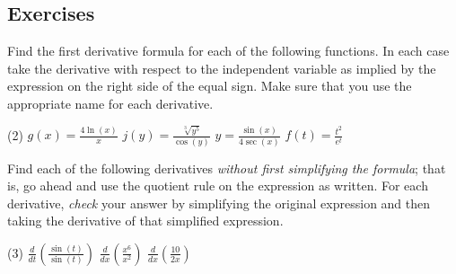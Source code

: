 \documentclass[12pt,]{book}
\theoremstyle{plain}
\theoremstyle{definition}
\numberwithin{equation}{section}
\newcommand{\fe}[2]{#1\mathopen{}\left(#2\right)\mathclose{}}
\newcommand{\lzoo}[2]{{\frac{d}{d#1}}{\left(#2\right)}}
\begin{document}
\subsection[Exercises]{Exercises}\label{exercises-38}
Find the first derivative formula for each of the following functions.  In each case take the derivative with respect to the independent variable as implied by the expression on the right side of the equal sign.  Make sure that you use the appropriate name for each derivative.%
\par
\begin{exercisegroup}(2)
\exercise[1.]\hypertarget{exercise-378}{\null}\(\fe{g}{x}=\frac{4\fe{\ln}{x}}{x}\)%
\exercise[2.]\hypertarget{exercise-379}{\null}\(\fe{j}{y}=\frac{\sqrt[3]{y^5}}{\fe{\cos}{y}}\)%
\exercise[3.]\hypertarget{exercise-380}{\null}\(y=\frac{\fe{\sin}{x}}{4\fe{\sec}{x}}\)%
\exercise[4.]\hypertarget{exercise-381}{\null}\(\fe{f}{t}=\frac{t^2}{e^t}\)%
\end{exercisegroup}
\par\smallskip\noindent
Find each of the following derivatives \emph{without first simplifying the formula}; that is, go ahead and use the quotient rule on the expression as written. For each derivative, \emph{check} your answer by simplifying the original expression and then taking the derivative of that simplified expression.%
\par
\begin{exercisegroup}(3)
\exercise[5.]\hypertarget{unsimplified-quotient-first}{\null}\(\lzoo{t}{\frac{\fe{\sin}{t}}{\fe{\sin}{t}}}\)%
\exercise[6.]\hypertarget{exercise-383}{\null}\(\lzoo{x}{\frac{x^6}{x^2}}\)%
\exercise[7.]\hypertarget{unsimplified-quotient-last}{\null}\(\lzoo{x}{\frac{10}{2x}}\)%
\end{exercisegroup}
\par\smallskip\noindent
\typeout{************************************************}
\typeout{************************************************}
\end{document}
